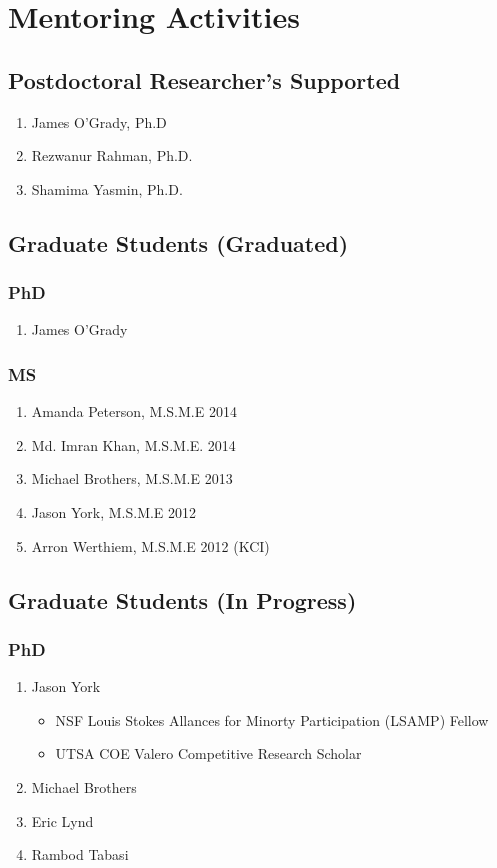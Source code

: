 \section*{Mentoring Activities}


\subsection*{Postdoctoral Researcher's Supported}
  \begin{enumerate}
    \item James O'Grady, Ph.D
    \item Rezwanur Rahman, Ph.D.
    \item Shamima Yasmin, Ph.D.
  \end{enumerate}

\subsection*{Graduate Students (Graduated)}

\subsubsection*{PhD}
\begin{enumerate}
  \item James O'Grady
\end{enumerate}

\subsubsection*{MS}
\begin{enumerate}
    \item Amanda Peterson, M.S.M.E 2014
    \item Md. Imran Khan, M.S.M.E. 2014
    \item Michael Brothers, M.S.M.E 2013
    \item Jason York, M.S.M.E 2012
    \item Arron Werthiem, M.S.M.E 2012 (KCI)
\end{enumerate}

\subsection*{Graduate Students (In Progress)}

\subsubsection*{PhD}
\begin{enumerate}
  \item Jason York
      \begin{itemize}
        \item NSF Louis Stokes Allances for Minorty Participation (LSAMP) Fellow
        \item UTSA COE Valero Competitive Research Scholar
      \end{itemize}
  \item Michael Brothers
  \item Eric Lynd
  \item Rambod Tabasi
\end{enumerate}

